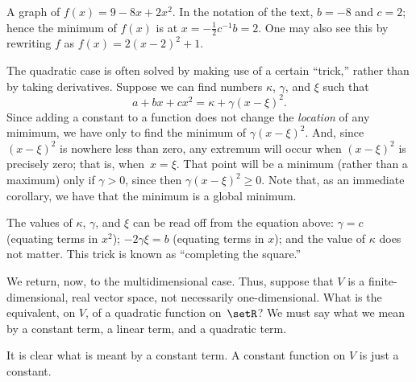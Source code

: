 \documentclass[10pt, a4paper]{article}
\begin{document}
\begin{marginfigure}
  \begin{center}
  \end{center}
\caption{A graph of $f(x) = 9 - 8x + 2x^2$. In the notation of the
  text, $b = -8$ and $c = 2$; hence the minimum of $f(x)$ is at
  $x=-\frac{1}{2}c^{-1}b = 2$. One may also see this by rewriting $f$
  as $f(x) = 2{(x-2)}^2+1$.\label{fig:quadratic}}
\end{marginfigure}

The quadratic case is often solved by making use of a certain “trick,”
rather than by taking derivatives. Suppose we can find numbers $\kappa$,
$\gamma$, and $\xi$ such that
\begin{equation*}
  a + bx + cx^2 = \kappa + \gamma{(x - \xi)}^2.
\end{equation*}
Since adding a constant to a function does not change the
\emph{location} of any mimimum, we have only to find the minimum of
$\gamma{(x-\xi)}^2$. And, since ${(x-\xi)}^2$ is nowhere less than zero, any
extremum will occur when ${(x-\xi)}^2$ is precisely zero; that is,
when~$x = \xi$. That point will be a minimum (rather than a maximum)
only if $\gamma>0$, since then $\gamma{(x-\xi)}^2\geq 0$. Note that, as an immediate
corollary, we have that the minimum is a global minimum.

The values of $\kappa$, $\gamma$, and $\xi$ can be read off from the equation
above: $\gamma=c$ (equating terms in $x^2$); $-2\gamma\xi=b$ (equating terms in
$x$); and the value of $\kappa$ does not matter. This trick is known as
“completing the square.” 

We return, now, to the multidimensional case. Thus, suppose that $V$
is a finite-dimensional, real vector space, not necessarily
one-dimensional. What is the equivalent, on $V$, of a quadratic
function on~$\setR$? We must say what we mean by a constant term, a
linear term, and a quadratic term.

It is clear what is meant by a constant term. A constant function on
$V$ is just a constant.
\end{document}
